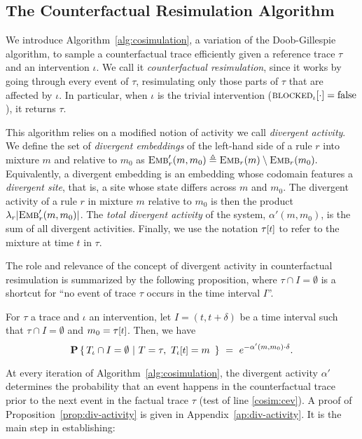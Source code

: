 \subsection{The Counterfactual Resimulation Algorithm}
\label{subsec:cosim-algo}

We introduce Algorithm~\ref{alg:cosimulation}, a
variation of the Doob-Gillespie algorithm, to sample a counterfactual
trace efficiently given a reference trace $\tau$ and an intervention
$\iota$. We call it \emph{counterfactual resimulation}, since it works
by going through every event of $\tau$, resimulating only those parts
of $\tau$ that are affected by $\iota$. In particular, when $\iota$ is
the trivial intervention (${\textsc{blocked}}_{\iota}[\cdot] = \text{false}$), it
returns $\tau$.

This algorithm relies on a modified notion of activity we call
\emph{divergent activity}. We define the set of \emph{divergent
  embeddings} of the left-hand side of a rule $r$ into mixture $m$ and
relative to $m_0$ as
${\textsc{Emb}}'_{r}(m, m_0) \triangleq {\textsc{Emb}}_{r}(m) \setminus {\textsc{Emb}}_{r}(m_0).$
Equivalently, a divergent embedding is an embedding whose codomain
features a \emph{divergent site}, that is, a site whose state differs
across $m$ and $m_0$. The {divergent activity} of a rule $r$ in
mixture $m$ relative to $m_0$ is then the product
$\lambda_r|{\textsc{Emb}}'_{r}(m, m_0)|$. The \emph{total divergent activity} of
the system, $\alpha'(m, m_0)$, is the sum of all divergent
activities. Finally, we use the notation $\TSTATE{t}{\tau}$ to refer
to the mixture at time $t$ in $\tau$.



The role and relevance of the concept of divergent activity in
counterfactual resimulation is summarized by the following
proposition, where $\tau \cap I = \emptyset$ is a shortcut for ``no
event of trace $\tau$ occurs in the time interval $I$''.
\smallskip
\begin{proposition}\label{prop:div-activity}
  For $\tau$ a trace and $\iota$ an intervention, let
  $I = (t, t+\delta)$ be a time interval such that
  $\tau \cap I = \emptyset$ and $m_0 = \TSTATE{t}{\tau}$. Then, we
  have
  \[\CProb{ \ATRAJ{} \cap I = \emptyset }{ T=\tau,\
      \TSTATE{t}{\ATRAJ{}} = m\ }
    \ =\ e^{-\alpha'(m, m_0) \cdot \delta}.
  \]
\end{proposition}
\smallskip
\noindent At every iteration of Algorithm~\ref{alg:cosimulation}, the
divergent activity $\alpha'$ determines the probability that an event
happens in the counterfactual trace prior to the next event in the
factual trace $\tau$ (test of line \ref{cosim:cev}). A proof of
Proposition~\ref{prop:div-activity} is given in
Appendix~\ref{ap:div-activity}.
It is the main step in establishing:

